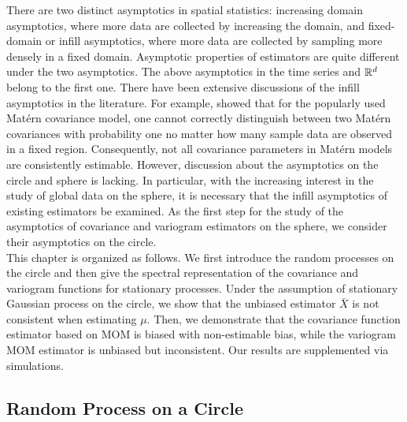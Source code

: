 There are two distinct asymptotics in spatial statistics: increasing domain asymptotics, where more data are collected by increasing the domain, and fixed-domain or infill asymptotics, where more data are collected by sampling more densely in a fixed domain. Asymptotic properties of estimators are quite different under the two asymptotics. The above asymptotics in the time series and $\mathbb{R}^d$ belong to the first one. There have been extensive discussions of the infill asymptotics in the literature. For example, \cite{Zhang:2004:IEA} showed that for the popularly used Mat\'{e}rn covariance model, one cannot correctly distinguish between two Mat\'{e}rn covariances with probability one no matter how many sample data are observed in a fixed region. Consequently, not all covariance parameters in Mat\'{e}rn models are consistently estimable. However, discussion about the asymptotics on the circle and sphere is lacking. In particular, with the increasing interest in the study of global data on the sphere, it is necessary that the infill asymptotics of existing estimators be examined. As the first step for the study of the asymptotics of covariance and variogram estimators on the sphere, we consider their asymptotics on the circle. \\

This chapter is organized as follows. We first introduce the random processes on the circle and then give the spectral representation of the covariance and variogram functions for stationary processes. Under the assumption of stationary Gaussian process on the circle, we show that the unbiased estimator $\bar{X}$ is not consistent when estimating $\mu$. Then, we demonstrate that the covariance function estimator based on MOM is biased with non-estimable bias, while the variogram MOM estimator is unbiased but inconsistent. Our results are supplemented via simulations.

\vskip 8pt
\subsection{Random Process on a Circle}

